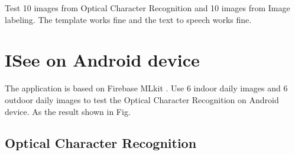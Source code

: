 \documentclass[11pt]{ucscthesis}
\begin{document}
Test 10 images from Optical Character Recognition and 10 images from Image labeling. The template works fine and the text to speech works fine.


\section{ISee on Android device}
The application is based on Firebase MLkit \cite{Android}. Use 6 indoor daily images and 6 outdoor daily images to test the Optical Character Recognition on Android device. As the result shown in Fig.

\subsection{Optical Character Recognition}
\begin{figure}
\centering
{}
  \hfill

\end{figure}
\end{document}
